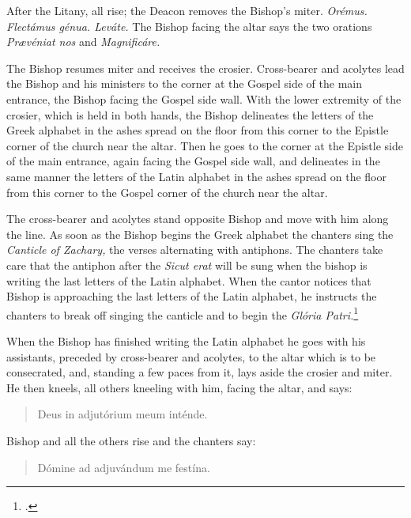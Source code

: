 \documentclass[letterpaper]{report}
\begin{document}
{    \rubric After the Litany, all rise; the Deacon removes the Bishop's miter.
    \textit{Or\'emus. Flectámus génua. Leváte.} The Bishop facing the altar
    says the two orations \textit{Pr\ae véniat nos} and \textit{Magnificáre.}

    \rubric The Bishop resumes miter and receives the crosier. Cross-bearer and
    acolytes lead the Bishop and his ministers to the corner at the Gospel side
    of the main entrance, the Bishop facing the Gospel side wall. With the
    lower extremity of the crosier, which is held in both hands, the Bishop
    delineates the letters of the Greek alphabet in the ashes spread on the
    floor from this corner to the Epistle corner of the church near the altar.
    Then he goes to the corner at the Epistle side of the main entrance, again
    facing the Gospel side wall, and delineates in the same manner the letters
    of the Latin alphabet in the ashes spread on the floor from this corner to
    the Gospel corner of the church near the altar.

    \rubric The cross-bearer and acolytes stand opposite Bishop and move with him
    along the line. As soon as the Bishop begins the Greek alphabet the
    chanters sing the \textit{Canticle of Zachary,} the verses alternating with
    antiphons. The chanters take care that the antiphon after the \textit{Sicut
    erat} will be sung when the bishop is writing the last letters of the Latin
    alphabet. When the cantor notices that Bishop is approaching the last
    letters of the Latin alphabet, he instructs the chanters to break off
    singing the canticle and to begin the \textit{Gl\'oria
    Patri.}\footcite[][p. 56.]{consecranda}

    \rubric When the Bishop has finished writing the Latin alphabet he goes
    with his assistants, preceded by cross-bearer and acolytes, to the altar
    which is to be consecrated, and, standing a few paces from it, lays aside
    the crosier and miter. He then kneels, all others kneeling with him, facing
    the altar, and says:

    \begin{quote}
        \vbar Deus in adjutórium meum inténde.
    \end{quote}

    Bishop and all the others rise and the chanters say:

    \begin{quote}
        \rbar Dómine ad adjuvándum me festína.
    \end{quote}

}
\end{document}
